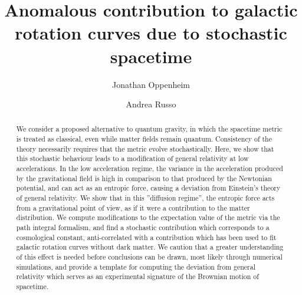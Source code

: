 \documentclass[aps,pra,amsmath,amssymb,amsthm,floatfix,nofootinbib,notitlepage,superscriptaddress,10pt]{revtex4-2}
\begin{document}
\title{Anomalous contribution to galactic rotation curves due to stochastic spacetime }
\author{Jonathan Oppenheim}
\author{Andrea Russo}
\begin{abstract}
   We consider a proposed alternative to quantum gravity, in which the spacetime metric is treated as classical, even while matter fields remain quantum. Consistency of the theory necessarily requires that the metric evolve stochastically. Here, we show that this stochastic behaviour leads to a modification of general relativity at low accelerations. 
    In the low acceleration regime, the variance in the acceleration produced by the gravitational field is high in comparison to that produced by the Newtonian potential, and can act as an entropic force, causing a deviation from Einstein's theory of general relativity. We show that in this ''diffusion regime'', the entropic force acts from a gravitational point of view, as if it were a contribution to the matter distribution. 
    We compute modifications to the expectation value of the metric via the path integral formalism, and find a stochastic contribution which corresponds to a cosmological constant, anti-correlated with a contribution which has been used to fit  galactic rotation curves without  dark matter. We caution that a greater understanding of this effect is needed before conclusions can be drawn, most likely through numerical simulations, and provide a template for computing the deviation from general relativity which serves as an experimental signature of the Brownian motion of spacetime.   
\end{abstract}
\maketitle
\end{document}
